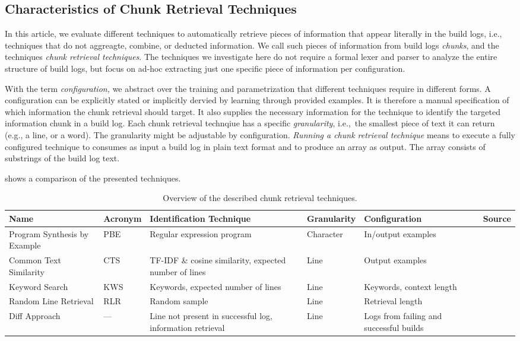 \subsection{Characteristics of Chunk Retrieval Techniques}
\label{sec:blirt}
In this article, we evaluate different techniques to automatically retrieve pieces of information that appear literally in the build logs, i.e., techniques that do not aggreagte, combine, or deducted information. We call such pieces of information from build logs \emph{chunks}, and the techniques \emph{chunk retrieval techniques}.
The techniques we investigate here do not require a formal lexer and parser to analyze the entire structure of build logs, but focus on ad-hoc extracting just one specific piece of information per configuration.

With the term \textit{configuration,} we abstract over the training and parametrization that different techniques require in different forms. A configuration can be explicitly stated or implicitly dervied by learning through provided examples. It is therefore a manual specification of which information the chunk retrieval should target. It also supplies the necessary information for the technique to identify the targeted information chunk in a build log.
Each chunk retrieval technqiue has a specific \textit{granularity}, i.e.,\ the smallest piece of text it can return (e.g., a line, or a word). The granularity might be adjustable by configuration.
\emph{Running a chunk retrieval technique} means to execute a fully configured technique to consumes as input a build log in plain text format and to produce an array as output. The array consists of substrings of the build log text.

 shows a comparison of the presented techniques.

\begin{table}[]
\centering
\caption{Overview of the described chunk retrieval techniques.}
\begin{tabularx}{\textwidth}{@{}XlXlXX@{}} 
\toprule
Name                         & Acronym & Identification Technique                                   & Granularity & Configuration & Source            \\ 
\midrule
Program Synthesis by Example & PBE     & Regular expression program                                 & Character   & In/output examples      \\
Common Text Similarity       & CTS     & TF-IDF \& cosine similarity, expected number of lines & Line        & Output examples           \\
Keyword Search               & KWS     & Keywords, expected number of lines                    & Line        & Keywords, context length  \\
Random Line Retrieval        & RLR     & Random sample                                              & Line        & Retrieval length          \\
Diff Approach                & ---     & Line not present in successful log, information retrieval  & Line        & Logs from failing and successful builds      \\
\bottomrule
\end{tabularx}
\label{tab:ctr}
\end{table}

